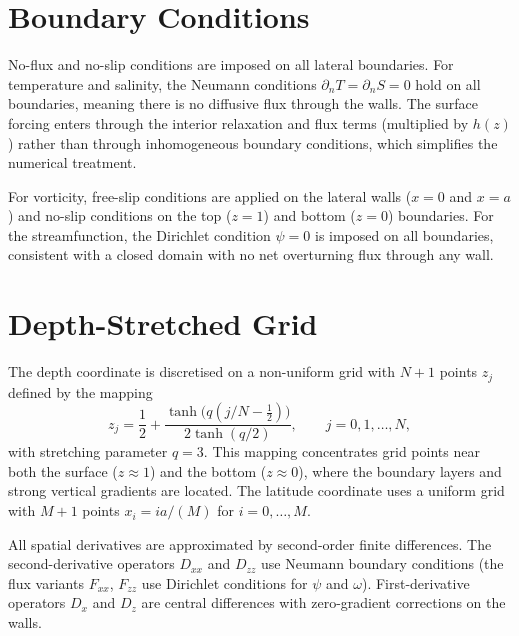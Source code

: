 \documentclass[12pt, a4paper]{article}
\begin{document}
\section{Boundary Conditions}
\label{sec:bcs}

No-flux and no-slip conditions are imposed on all lateral boundaries. For
temperature and salinity, the Neumann conditions $\partial_n T = \partial_n S = 0$
hold on all boundaries, meaning there is no diffusive flux through the walls.
The surface forcing enters through the interior relaxation and flux terms
(multiplied by $h(z)$) rather than through inhomogeneous boundary conditions,
which simplifies the numerical treatment.

For vorticity, free-slip conditions are applied on the lateral walls ($x = 0$
and $x = a$) and no-slip conditions on the top ($z = 1$) and bottom ($z = 0$)
boundaries. For the streamfunction, the Dirichlet condition $\psi = 0$ is
imposed on all boundaries, consistent with a closed domain with no net
overturning flux through any wall.

\section{Depth-Stretched Grid}
\label{sec:grid}

The depth coordinate is discretised on a non-uniform grid with $N + 1$ points
$z_j$ defined by the mapping
\begin{equation}
  z_j = \frac{1}{2} + \frac{\tanh\!\bigl(q(j/N - \tfrac{1}{2})\bigr)}{2\tanh(q/2)},
  \qquad j = 0, 1, \ldots, N,
  \label{eq:zgrid}
\end{equation}
with stretching parameter $q = 3$. This mapping concentrates grid points near
both the surface ($z \approx 1$) and the bottom ($z \approx 0$), where the
boundary layers and strong vertical gradients are located. The latitude
coordinate uses a uniform grid with $M + 1$ points $x_i = ia/(M)$ for
$i = 0,\ldots,M$.

All spatial derivatives are approximated by second-order finite differences.
The second-derivative operators $D_{xx}$ and $D_{zz}$ use Neumann boundary
conditions (the flux variants $F_{xx}$, $F_{zz}$ use Dirichlet conditions for
$\psi$ and $\omega$). First-derivative operators $D_x$ and $D_z$ are central
differences with zero-gradient corrections on the walls.
\end{document}
